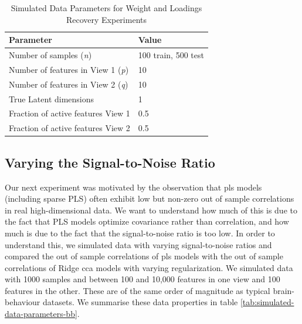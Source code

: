 \begin{table}
    \centering
    \caption{Simulated Data Parameters for Weight and Loadings Recovery Experiments}
    \begin{tabular}{| l | l |}
        \hline
        \textbf{Parameter}                        & \textbf{Value}                               \\
        \hline
        Number of samples (\textit{n})            & 100 train, 500 test                            \\
        Number of features in View 1 (\textit{p}) & 10 \\
        Number of features in View 2 (\textit{q}) & 10 \\
        True Latent dimensions                    & 1                                            \\
        Fraction of active features View 1            & 0.5                                          \\
        Fraction of active features View 2            & 0.5                                          \\
        \hline
    \end{tabular}\label{tab:simulated-data-parameters}
\end{table}

\subsection{Varying the Signal-to-Noise Ratio}

Our next experiment was motivated by the observation that \acrshort{pls} models (including sparse PLS) often exhibit low but non-zero out of sample correlations in real high-dimensional data.
We want to understand how much of this is due to the fact that PLS models optimize covariance rather than correlation, and how much is due to the fact that the signal-to-noise ratio is too low.
In order to understand this, we simulated data with varying signal-to-noise ratios and compared the out of sample correlations of \acrshort{pls} models with the out of sample correlations of Ridge \acrshort{cca} models with varying regularization.
We simulated data with 1000 samples and between 100 and 10,000 features in one view and 100 features in the other.
These are of the same order of magnitude as typical brain-behaviour datasets.
We summarise these data properties in table \ref{tab:simulated-data-parameters-bb}.


